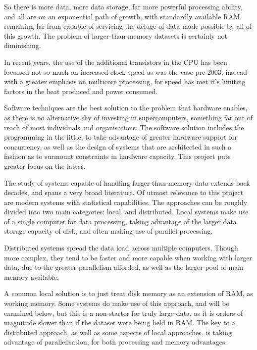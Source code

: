 So there is more data, more data storage, far more powerful processing ability, and all are on an exponential path of growth, with standardly available RAM remaining far from capable of servicing the deluge of data made possible by all of this growth\cite{sutter2005free}.
The problem of larger-than-memory datasets is certainly not diminishing.

In recent years, the use of the additional transistors in the CPU has been focussed not so much on increased clock speed as was the case pre-2003, instead with a greater emphasis on multicore processing, for speed has met it's limiting factors in the heat produced and power consumed\cite{sutter2005free}.

Software techniques are the best solution to the problem that hardware enables, as there is no alternative shy of investing in supercomputers, something far out of reach of most individuals and organisations.
The software solution includes the programming in the little, to take advantage of greater hardware support for concurrency, as well as the design of systems that are architected in such a fashion as to surmount constraints in hardware capacity.
This project puts greater focus on the latter.

The study of systems capable of handling larger-than-memory data extends back decades, and spans a very broad literature.
Of utmost relevance to this project are modern systems with statistical capabilities.
The approaches can be roughly divided into two main categories: local, and distributed.
Local systems make use of a single computer for data processing, taking advantage of the larger data storage capacity of disk, and often making use of parallel processing.

Distributed systems spread the data load across multiple computers.
Though more complex, they tend to be faster and more capable when working with larger data, due to the greater parallelism afforded, as well as the larger pool of main memory available\cite{foster1995parallel}.

A common local solution is to just treat disk memory as an extension of RAM, as working memory.
Some systems do make use of this approach, and will be examined below, but this is a non-starter for truly large data, as it is orders of magnitude slower than if the dataset were being held in RAM\cite{alpern1994memhierarchy}.
The key to a distributed approach, as well as some aspects of local approaches, is taking advantage of parallelisation, for both processing and memory advantages.

